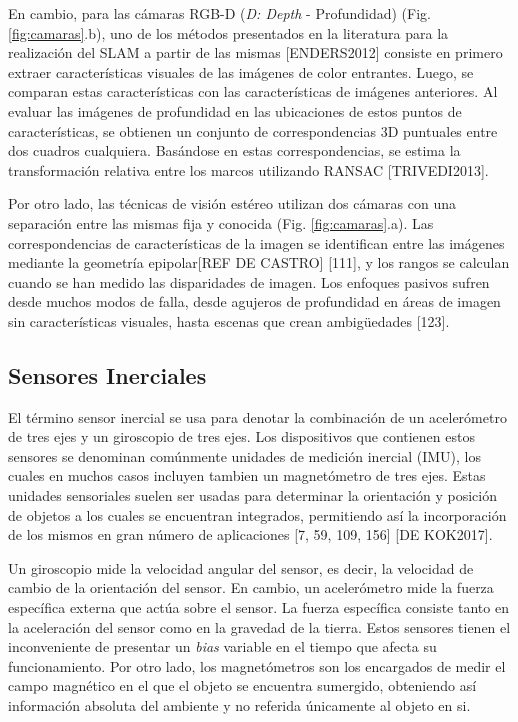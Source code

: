 En cambio, para las cámaras RGB-D (\textit{D: Depth} - Profundidad) (Fig. \ref{fig:camaras}.b), uno de los métodos presentados en la literatura para la realización del SLAM a partir de las mismas [ENDERS2012] consiste en primero extraer características visuales de las imágenes de color entrantes. Luego, se comparan estas características con las características de imágenes anteriores. Al evaluar las imágenes de profundidad en las ubicaciones de estos puntos de características, se obtienen un conjunto de correspondencias 3D puntuales entre dos cuadros cualquiera. Basándose en estas correspondencias, se estima la transformación relativa entre los marcos utilizando RANSAC [TRIVEDI2013].

Por otro lado, las técnicas de visión estéreo utilizan dos cámaras con una separación entre las mismas fija y conocida (Fig. \ref{fig:camaras}.a). Las correspondencias de características de la imagen se identifican entre las imágenes mediante la geometría epipolar[REF DE CASTRO] [111], y los rangos se calculan cuando se han medido las disparidades de imagen. Los enfoques pasivos sufren desde muchos modos de falla, desde agujeros de profundidad en áreas de imagen sin características visuales, hasta escenas que crean ambigüedades [123].


\subsection{Sensores Inerciales}
El término sensor inercial se usa para denotar la combinación de un acelerómetro de tres ejes y un giroscopio de tres ejes. Los dispositivos que contienen estos sensores se denominan comúnmente unidades de medición inercial (IMU), los cuales en muchos casos incluyen tambien un magnetómetro de tres ejes. Estas unidades sensoriales suelen ser usadas para determinar la orientación y posición de objetos a los cuales se encuentran integrados, permitiendo así la incorporación de los mismos en gran número de aplicaciones [7, 59, 109, 156] [DE KOK2017].

Un giroscopio mide la velocidad angular del sensor, es decir, la velocidad de cambio de la orientación del sensor. En cambio, un acelerómetro mide la fuerza específica externa que actúa sobre el sensor. La fuerza específica consiste tanto en la aceleración del sensor como en la gravedad de la tierra. Estos sensores tienen el inconveniente de presentar un \textit{bias} variable en el tiempo que afecta su funcionamiento. Por otro lado, los magnetómetros son los encargados de medir el campo magnético en el que el objeto se encuentra sumergido, obteniendo así información absoluta del ambiente y no referida únicamente al objeto en si.

